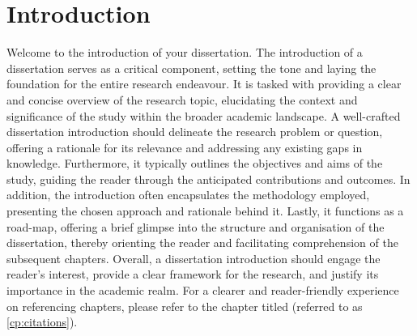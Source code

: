 \chapter{Introduction}
\label{cp:introduction}
Welcome to the introduction of your dissertation. The introduction of a dissertation serves as a critical component, setting the tone and laying the foundation for the entire research endeavour. It is tasked with providing a clear and concise overview of the research topic, elucidating the context and significance of the study within the broader academic landscape. A well-crafted dissertation introduction should delineate the research problem or question, offering a rationale for its relevance and addressing any existing gaps in knowledge. Furthermore, it typically outlines the objectives and aims of the study, guiding the reader through the anticipated contributions and outcomes. In addition, the introduction often encapsulates the methodology employed, presenting the chosen approach and rationale behind it. Lastly, it functions as a road-map, offering a brief glimpse into the structure and organisation of the dissertation, thereby orienting the reader and facilitating comprehension of the subsequent chapters. Overall, a dissertation introduction should engage the reader's interest, provide a clear framework for the research, and justify its importance in the academic realm. For a clearer and reader-friendly experience on referencing chapters, please refer to the chapter titled  (referred to as \autoref{cp:citations}).
